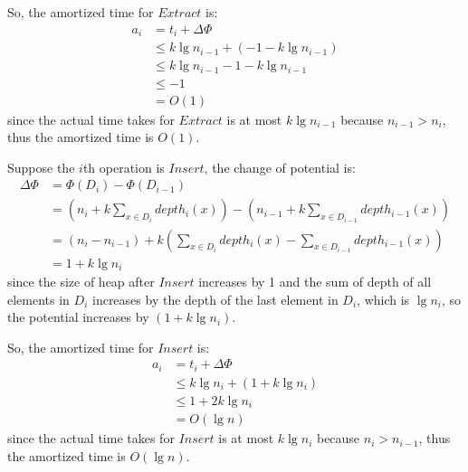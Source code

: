 \documentclass[11pt]{article}
\begin{document}
\begin{enumerate}
  So, the amortized time for $Extract$ is:
  \begin{align}
    a_i &= t_i + \Delta\Phi\\
    &\leq k\lg n_{i-1} + (-1 - k\lg n_{i-1})\\
    &\leq k\lg n_{i-1} -1 - k\lg n_{i-1}\\
    &\leq -1\\
    &= O(1)
  \end{align}
  since the actual time takes for $Extract$ is at most $k\lg n_{i-1}$
  because $n_{i-1} > n_i$, thus the amortized time is $O(1)$.

  Suppose the $i$th operation is $Insert$, the change of potential is:
  \begin{align}
    \Delta\Phi &= \Phi(D_i) - \Phi(D_{i-1})\\
    &= (n_i + k\sum_{x \in D_i} depth_i(x)) - (n_{i-1} + k\sum_{x \in
      D_{i-1}} depth_{i-1}(x)) \\
    &= (n_i - n_{i-1}) + k(\sum_{x \in D_i}depth_i(x) - \sum_{x \in
      D_{i-1}}depth_{i-1}(x))\\
    &= 1 + k\lg n_i
  \end{align}
  since the size of heap after $Insert$ increases by 1 and the sum of
  depth of all elements in $D_i$ increases by the depth of the last
  element in $D_i$, which is $\lg n_i$, so the potential
  increases by $(1 + k\lg n_i)$.
  
  So, the amortized time for $Insert$ is:
  \begin{align}
    a_i &= t_i + \Delta\Phi\\
    &\leq k\lg n_i + (1 + k\lg n_i)\\
    &\leq 1 + 2k\lg n_i\\
    &= O(\lg n)
  \end{align}
  since the actual time takes for $Insert$ is at most $k\lg n_i$
  because $n_i > n_{i-1}$, thus the amortized time is $O(\lg n)$.

\end{enumerate}
\end{document}
